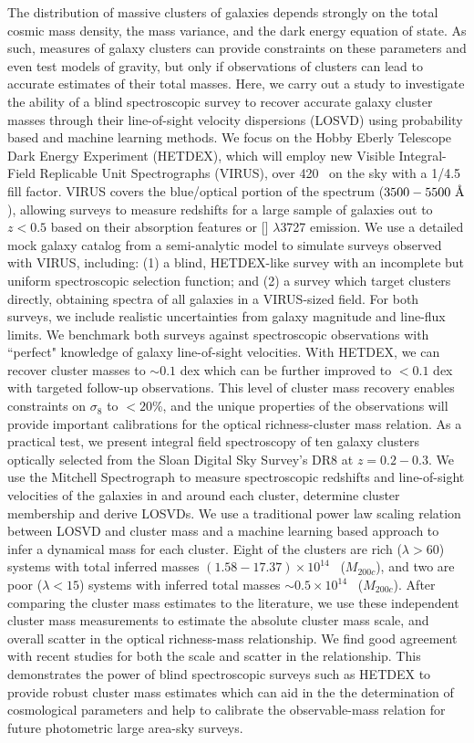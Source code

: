 \indent The distribution of massive clusters of galaxies depends strongly on the total cosmic mass density, the mass variance, and the dark energy equation of state. As such, measures of galaxy clusters can provide constraints on these parameters and even test models of gravity, but only if observations of clusters can lead to accurate estimates of their total masses. Here, we carry out a study to investigate the ability of a blind spectroscopic survey to recover accurate galaxy cluster masses through their line-of-sight velocity dispersions (LOSVD) using probability based and machine learning methods. We focus on the Hobby Eberly Telescope Dark Energy Experiment (HETDEX), which will employ new Visible Integral-Field Replicable Unit Spectrographs (VIRUS), over 420 \degsq\ on the sky with a 1/4.5 fill factor. VIRUS covers the blue/optical portion of the spectrum ($3500-5500~\hbox{\AA}$), allowing surveys to measure redshifts for a large sample of galaxies out to $z < 0.5$ based on their absorption features or \hbox{[]} $\lambda$3727 emission. We use a detailed mock galaxy catalog from a semi-analytic model to simulate surveys observed with VIRUS, including: (1) a blind, HETDEX-like survey with an incomplete but uniform spectroscopic selection function; and (2) a survey which target clusters directly, obtaining spectra of all galaxies in a VIRUS-sized field. For both surveys, we include realistic uncertainties from galaxy magnitude and line-flux limits. We benchmark both surveys against spectroscopic observations with ``perfect" knowledge of galaxy line-of-sight velocities. With HETDEX, we can recover cluster masses to $\sim0.1$ dex which can be further improved to $<0.1$ dex with targeted follow-up observations. This level of cluster mass recovery enables constraints on $\sigma_8$ to $<20$\%, and the unique properties of the observations will provide important calibrations for the optical richness-cluster mass relation. As a practical test, we present integral field spectroscopy of ten galaxy clusters optically selected from the Sloan Digital Sky Survey's DR8 at $z=0.2-0.3$. We use the Mitchell Spectrograph to measure spectroscopic redshifts and line-of-sight velocities of the galaxies in and around each cluster, determine cluster membership and derive LOSVDs. We use a traditional power law scaling relation between LOSVD and cluster mass and a machine learning based approach to infer a dynamical mass for each cluster. Eight of the clusters are rich ($\lambda>60$) systems with total inferred masses $(1.58-17.37) \times 10^{14}$ \Msol\ ($M_{200c}$), and two are poor ($\lambda<15$) systems with inferred total masses $\sim0.5 \times 10^{14}$ \Msol\ ($M_{200c}$). After comparing the cluster mass estimates to the literature, we use these independent cluster mass measurements to estimate the absolute cluster mass scale, and overall scatter in the optical richness-mass relationship. We find good agreement with recent studies for both the scale and scatter in the relationship. This demonstrates the power of blind spectroscopic surveys such as HETDEX to provide robust cluster mass estimates which can aid in the the determination of cosmological parameters and help to calibrate the observable-mass relation for future photometric large area-sky surveys.
\pagebreak{}
